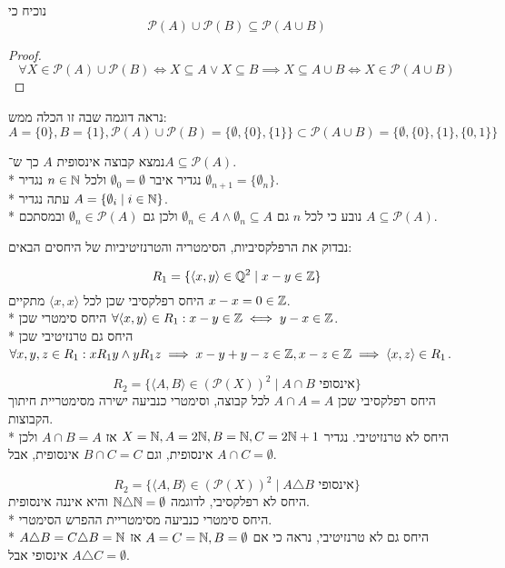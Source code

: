 \Subquestion{}
נוכיח כי
\[
	\mathcal{P}(A) \cup \mathcal{P}(B) \subseteq \mathcal{P}(A \cup B)
\]
\begin{proof}
	\[
		\forall X \in \mathcal{P}(A) \cup \mathcal{P}(B)
		\iff X \subseteq A \lor X \subseteq B
		\implies X \subseteq A \cup B
		\iff X \in \mathcal{P}(A \cup B)
	\]
\end{proof}
נראה דוגמה שבה זו הכלה ממש:
\[
	A = \{0\}, B = \{1\}, 
	\mathcal{P}(A) \cup \mathcal{P}(B) = \{\emptyset, \{0\}, \{1\}\} \subset \mathcal{P}(A \cup B)
	= \{\emptyset, \{0\}, \{1\}, \{0, 1\} \}
\]

\Subquestion{}
נמצא קבוצה אינסופית $A$ כך ש־$A \subseteq \mathcal{P}(A)$. \\*
נגדיר איבר $\emptyset_0 = \emptyset$ ולכל $n \in \mathbb{N}$ נגדיר $\emptyset_{n + 1} = \{\emptyset_n\}$. \\*
עתה נגדיר $A = \{\emptyset_i \mid i \in \mathbb{N} \}$. \\*
נובע כי לכל $n$ גם $\emptyset_n \in A \land \emptyset_n \subseteq A$ ולכן גם $\emptyset_n \in \mathcal{P}(A)$ ובמסתכם $A \subseteq \mathcal{P}(A)$.

\Question{}
נבדוק את הרפלקסיביות, הסימטריה והטרנזיטיביות של היחסים הבאים:

\Subquestion{}
\[
	R_1 = \{ \langle x, y \rangle \in \mathbb{Q}^2 \mid x - y \in \mathbb{Z} \}
\]
היחס רפלקסיבי שכן לכל $\langle x, x \rangle$ מתקיים $x - x = 0 \in \mathbb{Z}$. \\*
היחס סימטרי שכן $\forall \langle x, y \rangle \in R_1 : x - y \in \mathbb{Z} \iff y - x \in \mathbb{Z}$. \\*
היחס גם טרנזיטיבי שכן $\forall x, y, z \in R_1 : x R_1 y \land y R_1 z \implies x - y + y - z \in \mathbb{Z}, x - z \in \mathbb{Z} \implies \langle x, z \rangle \in R_1$.

\Subquestion{}
\[
	R_2 = \{ \langle A, B \rangle \in {(\mathcal{P}(X))}^2 \mid A \cap B \text{ אינסופי} \}
\]
היחס רפלקסיבי שכן $A \cap A = A$ לכל קבוצה, וסימטרי כנביעה ישירה מסימטריית חיתוך הקבוצות. \\*
היחס לא טרנזיטיבי. נגדיר $X = \mathbb{N}, A = 2\mathbb{N}, B = \mathbb{N}, C = 2\mathbb{N} + 1$ אז $A \cap B = A$ ולכן אינסופית, וגם $B \cap C = C$ אינסופית, אבל $A \cap C = \emptyset$.

\Subquestion{}
\[
	R_2 = \{ \langle A, B \rangle \in {(\mathcal{P}(X))}^2 \mid A \triangle B \text{ אינסופי} \}
\]
היחס לא רפלקסיבי, לדוגמה $\mathbb{N} \triangle \mathbb{N} = \emptyset$ והיא איננה אינסופית. \\*
היחס סימטרי כנביעה מסימטריית ההפרש הסימטרי. \\*
היחס גם לא טרנזיטיבי, נראה כי אם $A = C = \mathbb{N}, B = \emptyset$ אז $A \triangle B = C \triangle B = \mathbb{N}$ אינסופי אבל $A \triangle C = \emptyset$.

